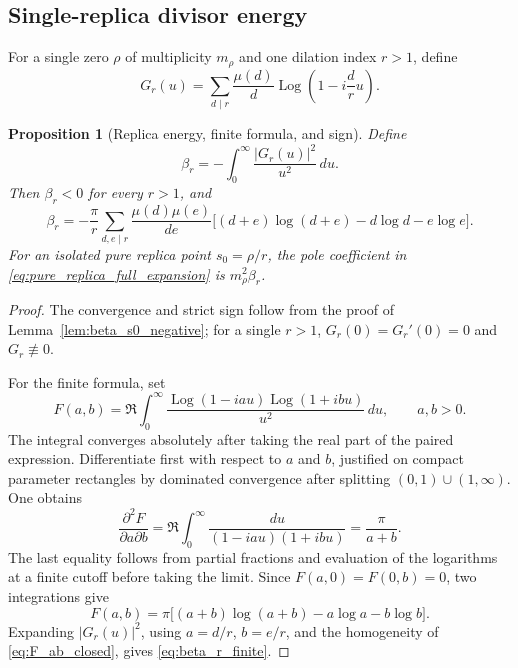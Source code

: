 \documentclass[11pt]{amsart}
\numberwithin{equation}{section}
\theoremstyle{plain}
\newtheorem{proposition}[theorem]{Proposition}
\theoremstyle{definition}
\theoremstyle{remark}
\newcommand{\Log}{\operatorname{Log}}
\begin{document}
\subsection{Single-replica divisor energy}
\label{subsec:single_replica_energy}

For a single zero \(\rho\) of multiplicity \(m_\rho\) and one dilation
index \(r>1\), define
\begin{equation}
G_r(u)=
\sum_{d\mid r}\frac{\mu(d)}d
\Log\left(1-i\frac d r u\right).
\label{eq:Gr_definition}
\end{equation}

\begin{proposition}[Replica energy, finite formula, and sign]
\label{prop:beta_r}
Define
\begin{equation}
\boxed{
\beta_r=-\int_0^\infty\frac{|G_r(u)|^2}{u^2}\,du.}
\label{eq:beta_r_energy}
\end{equation}
Then \(\beta_r<0\) for every \(r>1\), and
\begin{equation}
\boxed{
\beta_r=
-\frac{\pi}{r}
\sum_{d,e\mid r}\frac{\mu(d)\mu(e)}{de}
\Big[(d+e)\log(d+e)-d\log d-e\log e\Big].}
\label{eq:beta_r_finite}
\end{equation}
For an isolated pure replica point \(s_0=\rho/r\), the pole coefficient in
\eqref{eq:pure_replica_full_expansion} is \(m_\rho^2\beta_r\).
\end{proposition}

\begin{proof}
The convergence and strict sign follow from the proof of
Lemma~\ref{lem:beta_s0_negative}; for a single \(r>1\),
\(G_r(0)=G_r'(0)=0\) and \(G_r\not\equiv0\).

For the finite formula, set
\begin{equation}
F(a,b)=\Re\int_0^\infty
\frac{\Log(1-iau)\Log(1+ibu)}{u^2}\,du,
\qquad a,b>0.
\label{eq:F_ab_definition}
\end{equation}
The integral converges absolutely after taking the real part of the paired
expression.  Differentiate first with respect to \(a\) and \(b\), justified
on compact parameter rectangles by dominated convergence after splitting
\((0,1)\cup(1,\infty)\).  One obtains
\begin{equation}
\frac{\partial^2 F}{\partial a\partial b}
=\Re\int_0^\infty
\frac{du}{(1-iau)(1+ibu)}
=\frac{\pi}{a+b}.
\label{eq:F_cross_derivative}
\end{equation}
The last equality follows from partial fractions and evaluation of the
logarithms at a finite cutoff before taking the limit.  Since
\(F(a,0)=F(0,b)=0\), two integrations give
\begin{equation}
F(a,b)=
\pi\big[(a+b)\log(a+b)-a\log a-b\log b\big].
\label{eq:F_ab_closed}
\end{equation}
Expanding \(|G_r(u)|^2\), using
\(a=d/r\), \(b=e/r\), and the homogeneity of
\eqref{eq:F_ab_closed}, gives \eqref{eq:beta_r_finite}.
\end{proof}
\end{document}
